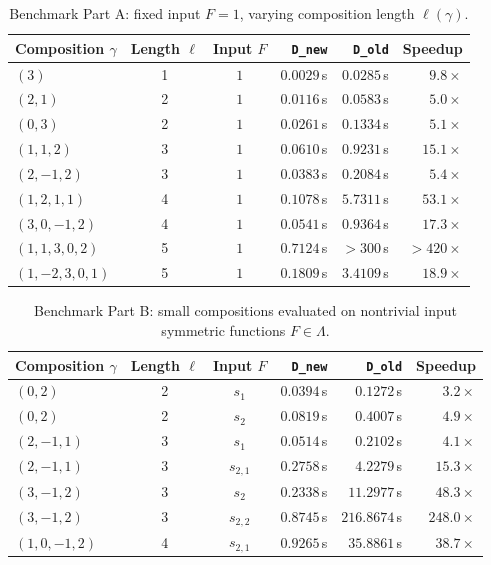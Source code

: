 \documentclass[reqno]{amsart}
\theoremstyle{plain}
\theoremstyle{definition}
\theoremstyle{remark}
\newcommand{\<}{\langle}
\renewcommand{\>}{\rangle}
\begin{document}
\begin{table}[ht]
    \centering
    \small
    \begin{tabular}{|l|c|c|r|r|r|}
        \hline
        Composition $\gamma$ & Length $\ell$ & Input $F$ & \texttt{D\_new} & \texttt{D\_old} & Speedup \\
        \hline
        $(3)$ & 1 & $1$ & $0.0029$\,s & $0.0285$\,s & $9.8\times$ \\
        $(2, 1)$ & 2 & $1$ & $0.0116$\,s & $0.0583$\,s & $5.0\times$ \\
        $(0, 3)$ & 2 & $1$ & $0.0261$\,s & $0.1334$\,s & $5.1\times$ \\
        $(1, 1, 2)$ & 3 & $1$ & $0.0610$\,s & $0.9231$\,s & $15.1\times$ \\
        $(2, -1, 2)$ & 3 & $1$ & $0.0383$\,s & $0.2084$\,s & $5.4\times$ \\
        $(1, 2, 1, 1)$ & 4 & $1$ & $0.1078$\,s & $5.7311$\,s & $53.1\times$ \\
        $(3, 0, -1, 2)$ & 4 & $1$ & $0.0541$\,s & $0.9364$\,s & $17.3\times$ \\
        $(1, 1, 3, 0, 2)$ & 5 & $1$ & $0.7124$\,s & $> 300$\,s & $>420\times$ \\
        $(1, -2, 3, 0, 1)$ & 5 & $1$ & $0.1809$\,s & $3.4109$\,s & $18.9\times$ \\
        \hline
    \end{tabular}
    \caption{Benchmark Part A: fixed input $F = 1$, varying composition length $\ell(\gamma)$.}
    \label{tab:benchmarks_a}
\end{table}

\begin{table}[ht]
    \centering
    \small
    \begin{tabular}{|l|c|c|r|r|r|}
        \hline
        Composition $\gamma$ & Length $\ell$ & Input $F$ & \texttt{D\_new} & \texttt{D\_old} & Speedup \\
        \hline
        $(0, 2)$ & 2 & $s_1$ & $0.0394$\,s & $0.1272$\,s & $3.2\times$ \\
        $(0, 2)$ & 2 & $s_2$ & $0.0819$\,s & $0.4007$\,s & $4.9\times$ \\
        $(2, -1, 1)$ & 3 & $s_1$ & $0.0514$\,s & $0.2102$\,s & $4.1\times$ \\
        $(2, -1, 1)$ & 3 & $s_{2,1}$ & $0.2758$\,s & $4.2279$\,s & $15.3\times$ \\
        $(3, -1, 2)$ & 3 & $s_2$ & $0.2338$\,s & $11.2977$\,s & $48.3\times$ \\
        $(3, -1, 2)$ & 3 & $s_{2,2}$ & $0.8745$\,s & $216.8674$\,s & $248.0\times$ \\
        $(1, 0, -1, 2)$ & 4 & $s_{2,1} $ & $0.9265$\,s & $35.8861$\,s & $38.7\times$ \\
        \hline
    \end{tabular}
    \caption{Benchmark Part B: small compositions evaluated on nontrivial input symmetric functions $F \in \Lambda$.}
    \label{tab:benchmarks_b}
\end{table}
\end{document}
